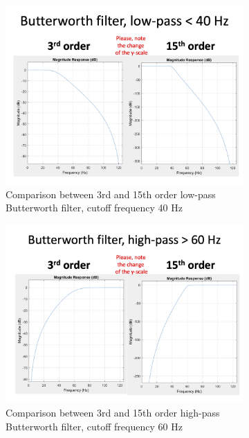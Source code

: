 \begin{figure}[!htpb]
\centering
\begin{subfigure}[b]{0.45\textwidth}
   \includegraphics[width=1\linewidth]{img/ch3/lp-butterworth-filter}
   \caption{Comparison between 3rd and 15th order low-pass Butterworth filter, cutoff frequency 40 Hz}
   \label{fig:lp-filters}
\end{subfigure}

\begin{subfigure}[b]{0.45\textwidth}
   \includegraphics[width=1\linewidth]{img/ch3/hp-butterworth-filter}
   \caption{Comparison between 3rd and 15th order high-pass Butterworth filter, cutoff frequency 60 Hz}
   \label{fig:hp-filters}
\end{subfigure}
\caption[]{}
\label{fig:filters}
\end{figure}

